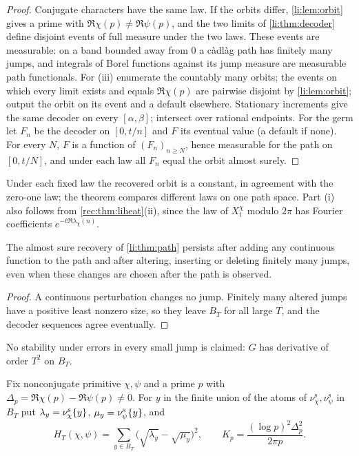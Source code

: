 \begin{proof}
Conjugate characters have the same law. If the orbits differ, \cref{li:lem:orbit} gives a prime with
$\Re\chi(p)\ne\Re\psi(p)$, and the two limits of \cref{li:thm:decoder} define disjoint events of full measure
under the two laws. These events are measurable: on a band bounded away from $0$ a c\`adl\`ag path has
finitely many jumps, and integrals of Borel functions against its jump measure are measurable path
functionals. For (iii) enumerate the countably many orbits; the events on which every limit
exists and equals $\Re\chi(p)$ are pairwise disjoint by \cref{li:lem:orbit}; output the orbit on its event
and a default elsewhere. Stationary increments give the same decoder on every $[\alpha,\beta]$; intersect
over rational endpoints. For the germ let $F_n$ be the decoder on $[0,t/n]$ and $F$ its eventual value
(a default if none). For every $N$, $F$ is a function of $(F_n)_{n\ge N}$, hence measurable for the path on
$[0,t/N]$, and under each law all $F_n$ equal the orbit almost surely.
\end{proof}

Under each fixed law the recovered orbit is a constant, in agreement with the zero-one law; the theorem
compares different laws on one path space. Part (i) also follows from \cref{rec:thm:liheat}(ii), since
the law of $X^\chi_t$ modulo $2\pi$ has Fourier coefficients $e^{-t\Re\lambda_\chi(n)}$.

\begin{corollary}\label{li:cor:pathrobust}
The almost sure recovery of \cref{li:thm:path} persists after adding any continuous function to the
path and after altering, inserting or deleting finitely many jumps, even when these changes are chosen
after the path is observed.
\end{corollary}

\begin{proof}
A continuous perturbation changes no jump. Finitely many altered jumps have a positive least nonzero
size, so they leave $B_T$ for all large $T$, and the decoder sequences agree eventually.
\end{proof}

No stability under errors in every small jump is claimed: $G$ has derivative of order $T^2$ on $B_T$.

Fix nonconjugate primitive $\chi,\psi$ and a prime $p$ with $\Delta_p=\Re\chi(p)-\Re\psi(p)\ne0$. For $y$ in the
finite union of the atoms of $\nu^{\mathrm s}_\chi,\nu^{\mathrm s}_\psi$ in $B_T$ put $\lambda_y=\nu^{\mathrm s}_\chi\{y\}$, $\mu_y=\nu^{\mathrm s}_\psi\{y\}$, and
\[
 H_T(\chi,\psi)=\sum_{y\in B_T}\bigl(\sqrt{\lambda_y}-\sqrt{\mu_y}\bigr)^2,\qquad K_p=\frac{(\log p)^2\Delta_p^2}{2\pi p}.
\]

